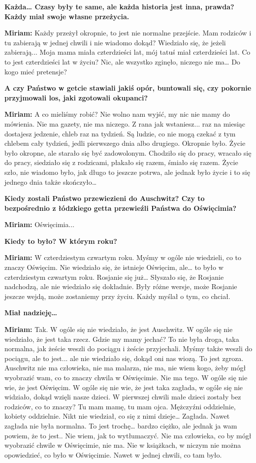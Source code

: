 \textbf{Każda… Czasy były te same, ale każda historia jest inna, prawda? Każdy miał swoje własne przeżycia.} 

\textbf{Miriam:} Każdy przeżył okropnie, to jest nie normalne przejście. Mam rodziców i tu zabierają w jednej chwili i nie wiadomo dokąd? Wiedziało się, że jeżeli zabierają... Moja mama miała czterdzieści lat, mój tatuś miał czterdzieści lat. Co to jest czterdzieści lat w życiu? Nic, ale wszystko zginęło, niczego nie ma… Do kogo mieć pretensje? 

\textbf{A czy Państwo w getcie stawiali jakiś opór, buntowali się, czy pokornie przyjmowali los, jaki zgotowali okupanci?}

\textbf{Miriam:} A co mieliśmy robić? Nie wolno nam wyjść, my nic nie mamy do mówienia. Nie ma gazety, nie ma niczego. Z rana jak wstaniesz... raz na miesiąc dostajesz jedzenie, chleb raz na tydzień. Są ludzie, co nie mogą czekać z tym chlebem cały tydzień, jedli pierwszego dnia albo drugiego. Okropnie było. Życie było okropne, ale starało się być zadowolonym. Chodziło się do pracy, wracało się do pracy, siedziało się z rodzicami, płakało się razem, śmiało się razem. Życie szło, nie wiadomo było, jak długo to jeszcze potrwa, ale jednak było życie i to się jednego dnia także skończyło… 

\textbf{Kiedy zostali Państwo przewiezieni do Auschwitz? Czy to bezpośrednio z łódzkiego getta przewieźli Państwa do Oświęcimia?} 

\textbf{Miriam:} Oświęcimia... 

\textbf{Kiedy to było? W którym roku?}

\textbf{Miriam:} W czterdziestym czwartym roku. Myśmy w ogóle nie wiedzieli, co to znaczy Oświęcim. Nie wiedziało się, że istnieje Oświęcim, ale… to było w czterdziestym czwartym roku. Rosjanie się już… Słyszało się, że Rosjanie nadchodzą, ale nie wiedziało się dokładnie. Były różne wersje, może Rosjanie jeszcze wejdą, może zostaniemy przy życiu. Każdy myślał o tym, co chciał. 

\textbf{Miał nadzieję…} 

\textbf{Miriam:} Tak. W ogóle się nie wiedziało, że jest Auschwitz. W ogóle się nie wiedziało, że jest taka rzecz. Gdzie my mamy jechać? To nie była droga, taka normalna, jak żeście weszli do pociągu i żeście przyjechali. Myśmy także weszli do pociągu, ale to jest...  ale nie wiedziało się, dokąd oni nas wiozą. To jest zgroza. Auschwitz nie ma człowieka, nie ma malarza, nie ma, nie wiem kogo, żeby mógł wyobrazić wam, co to znaczy chwila w Oświęcimie. Nie ma tego. W ogóle się nie wie, że jest Oświęcim. W ogóle się nie wie, że jest taka zagłada, w ogóle się nie widziało, dokąd wzięli nasze dzieci. W pierwszej chwili małe dzieci zostały bez rodziców, co to znaczy? Tu mam mamę, tu mam ojca. Mężczyźni oddzielnie, kobiety oddzielnie. Nikt nie wiedział, co się z nimi dzieje… Zagłada. Nawet zagłada nie była normalna. To jest trochę… bardzo ciężko, ale jednak ja wam powiem, że to jest.. Nie wiem, jak to wytłumaczyć. Nie ma człowieka, co by mógł wyobrazić chwile w Oświęcimie, nie ma. Nie w książkach, w niczym nie można opowiedzieć, co było w Oświęcimie. Nawet w jednej chwili, co tam było. 

